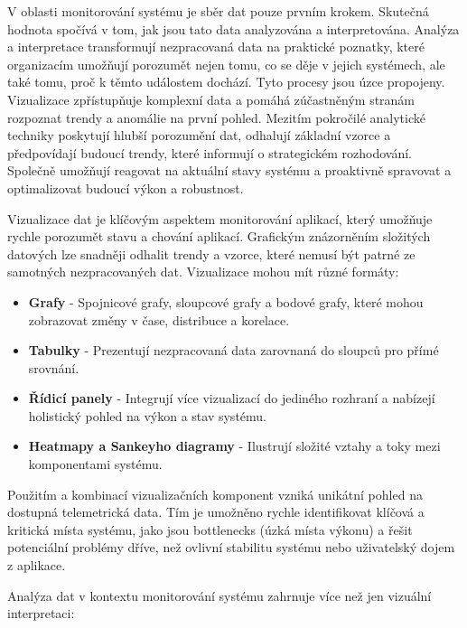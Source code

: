 
V oblasti monitorování systému je sběr dat pouze prvním krokem. Skutečná hodnota spočívá v tom, jak jsou tato data analyzována a interpretována. Analýza a interpretace transformují nezpracovaná data na praktické poznatky, které organizacím umožňují porozumět nejen tomu, co se děje v jejich systémech, ale také tomu, proč k těmto událostem dochází. Tyto procesy jsou úzce propojeny. Vizualizace zpřístupňuje komplexní data a pomáhá zúčastněným stranám rozpoznat trendy a anomálie na první pohled. Mezitím pokročilé analytické techniky poskytují hlubší porozumění dat, odhalují základní vzorce a předpovídají budoucí trendy, které informují o strategickém rozhodování. Společně umožňují reagovat na aktuální stavy systému a proaktivně spravovat a optimalizovat budoucí výkon a robustnost.


Vizualizace dat je klíčovým aspektem monitorování aplikací, který umožňuje rychle porozumět stavu a chování aplikací. Grafickým znázorněním složitých datových lze snadněji odhalit trendy a vzorce, které nemusí být patrné ze samotných nezpracovaných dat. Vizualizace mohou mít různé formáty:

\begin{itemize}
    \item \textbf{Grafy} - Spojnicové grafy, sloupcové grafy a bodové grafy, které mohou zobrazovat změny v čase, distribuce a korelace.
    \item \textbf{Tabulky} - Prezentují nezpracovaná data zarovnaná do sloupců pro přímé srovnání.
    \item \textbf{Řídicí panely} - Integrují více vizualizací do jediného rozhraní a nabízejí holistický pohled na výkon a stav systému.
    \item \textbf{Heatmapy a Sankeyho diagramy} - Ilustrují složité vztahy a toky mezi komponentami systému.
\end{itemize}

Použitím a kombinací vizualizačních komponent vzniká unikátní pohled na dostupná telemetrická data. Tím je umožněno rychle identifikovat klíčová a kritická místa systému, jako jsou bottlenecks (úzká místa výkonu) a řešit potenciální problémy dříve, než ovlivní stabilitu systému nebo uživatelský dojem z aplikace.


Analýza dat v kontextu monitorování systému zahrnuje více než jen vizuální interpretaci:


